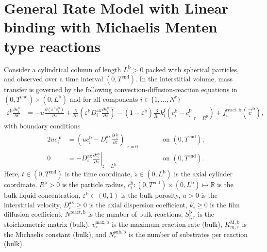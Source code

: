 \documentclass{article}
\begin{document}
\section*{General Rate Model with Linear binding with Michaelis Menten type reactions}
Consider a cylindrical column of length $L^{\mathrm{b}} > 0$ packed with spherical particles, and observed over a time interval $(0, T^{\mathrm{end}})$.
In the interstitial volume, mass transfer is governed by the following convection-diffusion-reaction equations in $(0, T^{\mathrm{end}})\times (0, L^{\mathrm{b}})$ and for all components $i\in\{1, \dots, N^{\mathrm{c}} \}$
\begin{align}
    \varepsilon^{\mathrm{b}} \frac{\partial c^{\mathrm{b}}_{i}}{\partial t}
    &= - u \frac{\partial \left( \varepsilon^{\mathrm{b}} c^{\mathrm{b}}_{i} \right)}{\partial z}
        + \frac{\partial}{\partial z} \left( \varepsilon^{\mathrm{b}} D^{\mathrm{ax}}_{i} \frac{\partial c^{\mathrm{b}}_{i}}{\partial z} \right)
        - \left(1 - \varepsilon^{\mathrm{b}} \right) \frac{3}{R^{\mathrm{p}}} k^{\mathrm{f}}_{i} \left(c^{\mathrm{b}}_{i} - \left. c^{\mathrm{p}}_{i} \right|_{r = R^{\mathrm{p}}} \right)
        + f^{\mathrm{react},\mathrm{b}}_{i}\left( \vec{c}^{\mathrm{b}} \right),
\end{align}
with boundary conditions
\begin{alignat}{2}
    u c^{\mathrm{in}}_{i}
    &= \left.\left( u c^{\mathrm{b}}_{i} - D^{\mathrm{ax}}_{i} \frac{\partial c^{\mathrm{b}}_{i}}{\partial z}\right)\right|_{z=0}
    & & \qquad\text{on }(0, T^{\mathrm{end}}),
    \\
    0
    &= - D^{\mathrm{ax}}_{i} \left. \frac{\partial c^{\mathrm{b}}_{i}}{\partial z} \right|_{z=L^{\mathrm{b}}}
    & & \qquad\text{on }(0, T^{\mathrm{end}}).
\end{alignat}
Here, $t\in (0, T^{\mathrm{end}})$ is the time coordinate, $z\in (0, L^{\mathrm{b}})$ is the axial cylinder coordinate, $R^{\mathrm{p}}> 0$ is the particle radius, $c^{\mathrm{b}}_{i}\colon (0, T^{\mathrm{end}})\times (0, L^{\mathrm{b}}) \mapsto \mathbb{R}$ is the bulk liquid concentration, $\varepsilon^{\mathrm{b}}\in (0, 1)$ is the bulk porosity, $u> 0$ is the interstitial velocity, $D^{\mathrm{ax}}_{i}\geq 0$ is the axial dispersion coefficient, $k^{\mathrm{f}}_{i}\geq 0$ is the film diffusion coefficient, $N^{\mathrm{react},\mathrm{b}}$ is the number of bulk reactions, $S^{\mathrm{b}}_{i,r}$ is the stoichiometric matrix (bulk), $v^{\mathrm{max},\mathrm{b}}_{r}$ is the maximum reaction rate (bulk), $K^{\mathrm{M},\mathrm{b}}_{m,r}$ is the Michaelis constant (bulk), and $N^{\mathrm{sub},\mathrm{b}}_{r}$ is the number of substrates per reaction (bulk).
\end{document}
